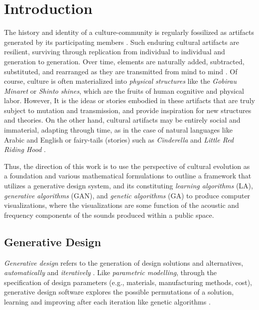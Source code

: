 \documentclass{evolang12}
\begin{document}
\section{Introduction}
\frenchspacing
The history and identity of a culture-community is regularly fossilized as artifacts generated by its participating members \cite{dor2015instruction,ferdinand2015inductive}. Such enduring cultural artifacts are resilient, surviving through replication from individual to individual and generation to generation. Over time, elements are naturally added, subtracted, substituted, and rearranged as they are transmitted from mind to mind \cite{ferdinand2015inductive}. Of course, culture is often materialized into \textit{physical structures} like the \textit{Gobirau Minaret} or \textit{Shinto shines}, which are the fruits of human cognitive and physical labor. However, It is the ideas or stories embodied in these artifacts that are truly subject to mutation and transmission, and provide inspiration for new structures and theories. On the other hand, cultural artifacts may be entirely social and immaterial, adapting through time, as in the case of natural languages like Arabic and English \cite{ferdinand2019cognitive,dor2015instruction} or fairy-tails (stories) such as \textit{Cinderella} and \textit{Little Red Riding Hood} \cite{stubbersfield2015serial,breithaupt2013disappearance}. 

Thus, the direction of this work is to use the perspective of cultural evolution as a foundation and various mathematical formulations to outline a framework that utilizes a generative design system, and its constituting \textit{learning algorithms} (LA), \textit{generative algorithms} (GAN), and \textit{genetic algorithms} (GA) to produce computer visualizations, where the visualizations are some function of the acoustic and frequency components of the sounds produced within a public space. 


\subsection{Generative Design}
\textit{Generative design} refers to the generation of design solutions and alternatives, \textit{automatically} and \textit{iteratively} \cite{krish2011practical,sanguinetti2015automated}. Like \textit{parametric modelling}, through the specification of design parameters (e.g., materials, manufacturing methods, cost), generative design software explores the possible permutations of a solution, learning and improving after each iteration like genetic algorithms \cite{krish2011practical}. 
\end{document}
